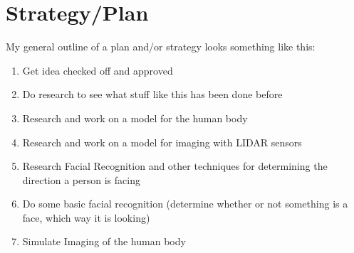 \documentclass[a4paper]{article}
\begin{document}
\section{Strategy/Plan}
My general outline of a plan and/or strategy looks something like this:
\begin{enumerate}
\item Get idea checked off and approved
\item Do research to see what stuff like this has been done before
\item Research and work on a model for the human body
\item Research and work on a model for imaging with LIDAR sensors
\item Research Facial Recognition and other techniques for determining the direction a person is facing
\item Do some basic facial recognition (determine whether or not something is a face, which way it is looking)
\item Simulate Imaging of the human body
\end{enumerate}
\end{document}

